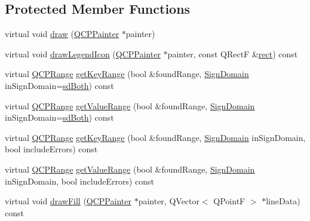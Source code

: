 \subsection*{Protected Member Functions}
\begin{DoxyCompactItemize}
\item 
virtual void \hyperlink{class_q_c_p_graph_a659218cc62c2a7786213d9dd429c1c8d}{draw} (\hyperlink{class_q_c_p_painter}{Q\+C\+P\+Painter} $\ast$painter)
\item 
virtual void \hyperlink{class_q_c_p_graph_a32115df0e940cf8ca7b687873c2d02ee}{draw\+Legend\+Icon} (\hyperlink{class_q_c_p_painter}{Q\+C\+P\+Painter} $\ast$painter, const Q\+Rect\+F \&\hyperlink{_gen_blob_8m_aea8f6815d9a63491fc422c5572c6b3c3}{rect}) const 
\item 
virtual \hyperlink{class_q_c_p_range}{Q\+C\+P\+Range} \hyperlink{class_q_c_p_graph_afc246ce6201ff564ac440efaec52ab11}{get\+Key\+Range} (bool \&found\+Range, \hyperlink{class_q_c_p_abstract_plottable_a661743478a1d3c09d28ec2711d7653d8}{Sign\+Domain} in\+Sign\+Domain=\hyperlink{class_q_c_p_abstract_plottable_a661743478a1d3c09d28ec2711d7653d8a082b98cfb91a7363a3b5cd17b0c1cd60}{sd\+Both}) const 
\item 
virtual \hyperlink{class_q_c_p_range}{Q\+C\+P\+Range} \hyperlink{class_q_c_p_graph_a856e90b8ab6b31c344b14a863ab9e5d2}{get\+Value\+Range} (bool \&found\+Range, \hyperlink{class_q_c_p_abstract_plottable_a661743478a1d3c09d28ec2711d7653d8}{Sign\+Domain} in\+Sign\+Domain=\hyperlink{class_q_c_p_abstract_plottable_a661743478a1d3c09d28ec2711d7653d8a082b98cfb91a7363a3b5cd17b0c1cd60}{sd\+Both}) const 
\item 
virtual \hyperlink{class_q_c_p_range}{Q\+C\+P\+Range} \hyperlink{class_q_c_p_graph_aa75c6f028124032416a5cf7145dfba60}{get\+Key\+Range} (bool \&found\+Range, \hyperlink{class_q_c_p_abstract_plottable_a661743478a1d3c09d28ec2711d7653d8}{Sign\+Domain} in\+Sign\+Domain, bool include\+Errors) const 
\item 
virtual \hyperlink{class_q_c_p_range}{Q\+C\+P\+Range} \hyperlink{class_q_c_p_graph_ab964a21d680af93435d68126d8c5ab29}{get\+Value\+Range} (bool \&found\+Range, \hyperlink{class_q_c_p_abstract_plottable_a661743478a1d3c09d28ec2711d7653d8}{Sign\+Domain} in\+Sign\+Domain, bool include\+Errors) const 
\item 
virtual void \hyperlink{class_q_c_p_graph_ad6d07926e6d6b7cfa70258780d47b7a0}{draw\+Fill} (\hyperlink{class_q_c_p_painter}{Q\+C\+P\+Painter} $\ast$painter, Q\+Vector$<$ Q\+Point\+F $>$ $\ast$line\+Data) const 
\item 

\end{DoxyCompactItemize}
